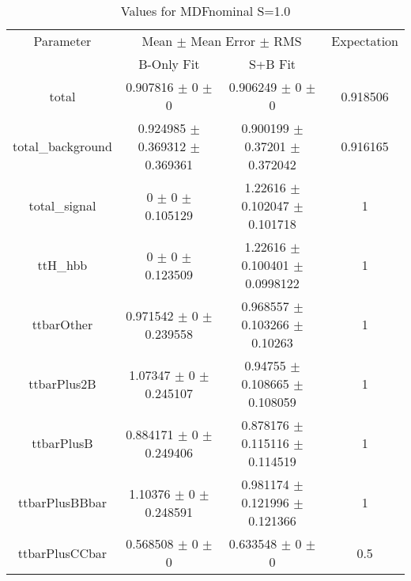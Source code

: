 \begin{table}
\centering
\caption{Values for MDFnominal S=1.0}
\begin{tabular}{cccc}
\toprule
Parameter & \multicolumn{2}{c}{Mean $\pm$ Mean Error $\pm$ RMS} & Expectation\\
 & B-Only Fit & S+B Fit & \\
\midrule
total & \num{0.907816} $\pm$ \num{0} $\pm$ \num{0} & \num{0.906249} $\pm$ \num{0} $\pm$ \num{0} & \num{0.918506}\\
total\_background & \num{0.924985} $\pm$ \num{0.369312} $\pm$ \num{0.369361} & \num{0.900199} $\pm$ \num{0.37201} $\pm$ \num{0.372042} & \num{0.916165}\\
total\_signal & \num{0} $\pm$ \num{0} $\pm$ \num{0.105129} & \num{1.22616} $\pm$ \num{0.102047} $\pm$ \num{0.101718} & \num{1}\\
ttH\_hbb & \num{0} $\pm$ \num{0} $\pm$ \num{0.123509} & \num{1.22616} $\pm$ \num{0.100401} $\pm$ \num{0.0998122} & \num{1}\\
ttbarOther & \num{0.971542} $\pm$ \num{0} $\pm$ \num{0.239558} & \num{0.968557} $\pm$ \num{0.103266} $\pm$ \num{0.10263} & \num{1}\\
ttbarPlus2B & \num{1.07347} $\pm$ \num{0} $\pm$ \num{0.245107} & \num{0.94755} $\pm$ \num{0.108665} $\pm$ \num{0.108059} & \num{1}\\
ttbarPlusB & \num{0.884171} $\pm$ \num{0} $\pm$ \num{0.249406} & \num{0.878176} $\pm$ \num{0.115116} $\pm$ \num{0.114519} & \num{1}\\
ttbarPlusBBbar & \num{1.10376} $\pm$ \num{0} $\pm$ \num{0.248591} & \num{0.981174} $\pm$ \num{0.121996} $\pm$ \num{0.121366} & \num{1}\\
ttbarPlusCCbar & \num{0.568508} $\pm$ \num{0} $\pm$ \num{0} & \num{0.633548} $\pm$ \num{0} $\pm$ \num{0} & \num{0.5}\\
\bottomrule
\end{tabular}
\end{table}